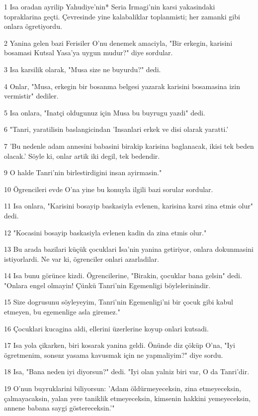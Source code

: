 \par 1 Isa oradan ayrilip Yahudiye'nin* Seria Irmagi'nin karsi yakasindaki topraklarina geçti. Çevresinde yine kalabaliklar toplanmisti; her zamanki gibi onlara ögretiyordu.
\par 2 Yanina gelen bazi Ferisiler O'nu denemek amaciyla, "Bir erkegin, karisini bosamasi Kutsal Yasa'ya uygun mudur?" diye sordular.
\par 3 Isa karsilik olarak, "Musa size ne buyurdu?" dedi.
\par 4 Onlar, "Musa, erkegin bir bosanma belgesi yazarak karisini bosamasina izin vermistir" dediler.
\par 5 Isa onlara, "Inatçi oldugunuz için Musa bu buyrugu yazdi" dedi.
\par 6 "Tanri, yaratilisin baslangicindan 'Insanlari erkek ve disi olarak yaratti.'
\par 7 'Bu nedenle adam annesini babasini birakip karisina baglanacak, ikisi tek beden olacak.' Söyle ki, onlar artik iki degil, tek bedendir.
\par 9 O halde Tanri'nin birlestirdigini insan ayirmasin."
\par 10 Ögrencileri evde O'na yine bu konuyla ilgili bazi sorular sordular.
\par 11 Isa onlara, "Karisini bosayip baskasiyla evlenen, karisina karsi zina etmis olur" dedi.
\par 12 "Kocasini bosayip baskasiyla evlenen kadin da zina etmis olur."
\par 13 Bu arada bazilari küçük çocuklari Isa'nin yanina getiriyor, onlara dokunmasini istiyorlardi. Ne var ki, ögrenciler onlari azarladilar.
\par 14 Isa bunu görünce kizdi. Ögrencilerine, "Birakin, çocuklar bana gelsin" dedi. "Onlara engel olmayin! Çünkü Tanri'nin Egemenligi böylelerinindir.
\par 15 Size dogrusunu söyleyeyim, Tanri'nin Egemenligi'ni bir çocuk gibi kabul etmeyen, bu egemenlige asla giremez."
\par 16 Çocuklari kucagina aldi, ellerini üzerlerine koyup onlari kutsadi.
\par 17 Isa yola çikarken, biri kosarak yanina geldi. Önünde diz çöküp O'na, "Iyi ögretmenim, sonsuz yasama kavusmak için ne yapmaliyim?" diye sordu.
\par 18 Isa, "Bana neden iyi diyorsun?" dedi. "Iyi olan yalniz biri var, O da Tanri'dir.
\par 19 O'nun buyruklarini biliyorsun: 'Adam öldürmeyeceksin, zina etmeyeceksin, çalmayacaksin, yalan yere taniklik etmeyeceksin, kimsenin hakkini yemeyeceksin, annene babana saygi göstereceksin.'"
